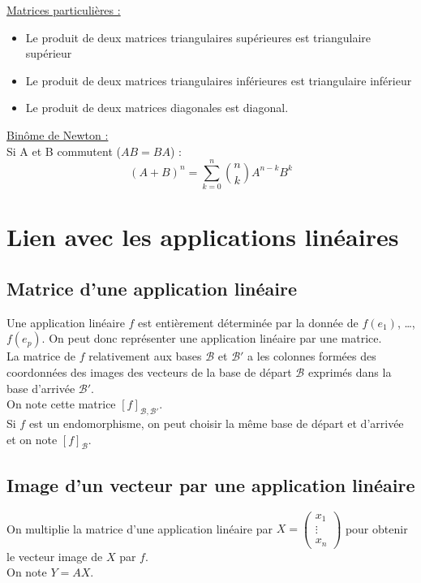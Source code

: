         \underline{Matrices particulières :}
        \begin{itemize}
            \item Le produit de deux matrices triangulaires supérieures est triangulaire supérieur
            \item Le produit de deux matrices triangulaires inférieures est triangulaire inférieur
            \item Le produit de deux matrices diagonales est diagonal\vspace{5pt}.
        \end{itemize}

        \underline{Binôme de Newton :}\\
        Si A et B commutent ($AB = BA$) :
        \[ (A + B)^n = \sum_{k=0}^{n} \binom{n}{k} A^{n-k} B^k \]


\section{Lien avec les applications linéaires}

    \subsection{Matrice d'une application linéaire}

        Une application linéaire $f$ est entièrement déterminée par la donnée de $f(e_1)$, \ldots, $f(e_p)$.
        On peut donc représenter une application linéaire par une matrice.\\

        La matrice de $f$ relativement aux bases $\mathcal{B}$ et $\mathcal{B}'$ a les colonnes formées des coordonnées des images des vecteurs de la base de départ $\mathcal{B}$ exprimés dans la base d'arrivée $\mathcal{B}'$.\\
        On note cette matrice $[f]_{\mathcal{B},\mathcal{B}'}$.\\

        Si $f$ est un endomorphisme, on peut choisir la même base  de départ et d'arrivée et on note $[f]_{\mathcal{B}}$.

    \subsection{Image d'un vecteur par une application linéaire}

        On multiplie la matrice d'une application linéaire par
        $X = \begin{pmatrix}
                 x_1\\ \vdots\\ x_n
        \end{pmatrix}$
        pour obtenir le vecteur image de $X$ par $f$.\\
        On note $Y = AX$.



